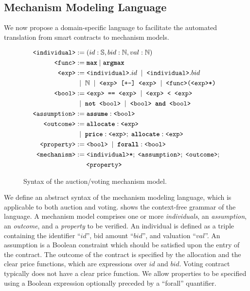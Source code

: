 

\subsection{Mechanism Modeling Language}\label{subsection:syntax}

We now propose a domain-specific language to facilitate the automated translation from smart
contracts to mechanism models.


\begin{figure}[t]
\small
\begin{align*}
  \texttt{<individual>}  &:= (id: \mathbb{S}, bid: \mathbb{N}, val: \mathbb{N} ) \\
  \texttt{<func>}        &:= \texttt{\textbf{max}} \;|\; \texttt{\textbf{argmax}} \\
  \texttt{<exp>}         &:= \texttt{<individual>}.id \;\;|\;\; \texttt{<individual>}.bid \\
                         &\;\;|\;\; \mathbb{N} \;\;|\;\; \texttt{<exp> \texttt{[+-]} <exp>}
                          \;\;|\;\; \texttt{<func>(<exp>*)} \\
  \texttt{<bool>}        &:= \texttt{<exp> == <exp>} \;\;|\;\; \texttt{<exp> < <exp>} \\
                         &\;\;|\;\; \texttt{\textbf{not }} \texttt{<bool>} \;\;|\;\; \texttt{<bool>}
                          \texttt{\textbf{ and }} \texttt{<bool>} \\
  \texttt{<assumption>}  &:= \texttt{\textbf{assume}} : \texttt{<bool>} \\
  \texttt{<outcome>}     &:= \texttt{\textbf{allocate}} : \texttt{<exp>} \\
                         &\;\;|\;\; \texttt{\textbf{price}} : \texttt{<exp>}; \;
                          \texttt{\textbf{allocate}} : \texttt{<exp>} \\
  \texttt{<property>}    &:= \texttt{<bool>} \;\;|\;\; \texttt{\textbf{forall}} : \texttt{<bool>} \\
  \texttt{<mechanism>}   &:= \texttt{<individual>*}; \; \texttt{<assumption>}; \;
                          \texttt{<outcome>}; \\
                         &\quad\;\; \texttt{<property>}
\end{align*}%
\caption{Syntax of the auction/voting mechanism model.}\label{syntax}
\end{figure}

We define an abstract syntax of the mechanism modeling language, which is applicable to both auction
and voting.
 shows the context-free grammar of the language.
A mechanism model comprises one or more \emph{individuals}, an \emph{assumption}, an
\emph{outcome}, and a \emph{property} to be verified.
An individual is defined as a triple containing the identifier ``$id$'', bid amount ``$bid$'', and
valuation ``$val$''.
An assumption is a Boolean constraint which should be satisfied upon the entry of the contract.
The outcome of the contract is specified by the allocation and the clear price functions, which are
expressions over $id$ and $bid$.
Voting contract typically does not have a clear price function.
We allow properties to be specified using a Boolean expression optionally preceded by a ``forall''
quantifier.

